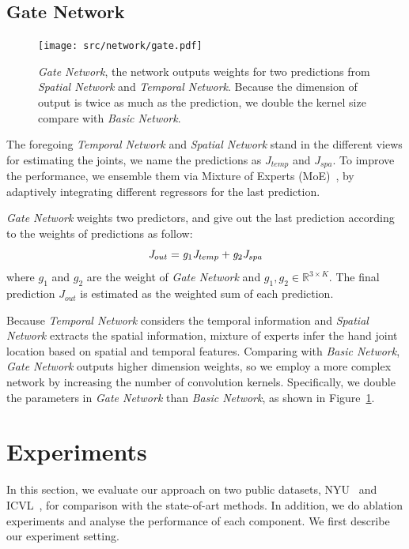 \documentclass[journal,comsoc]{IEEEtran}
\let\MYoriglatexcaption\caption
\renewcommand{\caption}[2][\relax]{\MYoriglatexcaption[#2]{#2}}
\begin{document}
\subsection{Gate Network}\label{sec:gate network}
\begin{figure}[t]\footnotesize
\centering
    \texttt{[image: src/network/gate.pdf]}
    \caption{\emph{Gate Network}, the network outputs weights for two predictions from \emph{Spatial Network} and \emph{Temporal Network}.
    Because the dimension of output is twice as much as the prediction, we double the kernel size compare with \emph{Basic Network}.}
\label{fig:gate}
\end{figure}
The foregoing \emph{Temporal Network} and \emph{Spatial Network} stand in the different views
for estimating the joints, we name the predictions as $\mathit{J}_{temp}$ and $\mathit{J}_{spa}$. To improve
the performance, we ensemble them via Mixture of Experts (MoE)~\cite{jacobs1991adaptive}, by adaptively integrating
different regressors for the last prediction.

\emph{Gate Network} weights two predictors, and give out the last prediction according to
the weights of predictions as follow:
\begin{equation}\label{eq:gate network}
\centering
\mathit{J}_{out} = \mathit{g}_1 \mathit{J}_{temp} + \mathit{g}_2 \mathit{J}_{spa}
\end{equation}
where $\mathit{g}_1$ and $\mathit{g}_2$ are the weight of \emph{Gate Network} and $\mathit{g}_1, \mathit{g}_2 \in
\mathbb{R}^{3 \times K}$. The final prediction $\mathit{J}_{out}$ is estimated as the weighted sum of each prediction.

Because \emph{Temporal Network} considers the temporal information and \emph{Spatial Network}
extracts the spatial information, mixture of experts infer the hand joint location based on
spatial and temporal features. Comparing with \emph{Basic Network}, \emph{Gate Network} outputs higher
dimension weights, so we employ a more complex network by increasing the number of convolution kernels.
Specifically, we double the parameters in \emph{Gate Network} than \emph{Basic Network}, as shown in Figure~\ref{fig:gate}.

\section{Experiments}\label{sec:experiments}
In this section, we evaluate our approach on two public datasets, NYU~\cite{tompson2014real}
and ICVL~\cite{tang2014latent}, for comparison with the state-of-art methods. In addition, we
do ablation experiments and analyse the performance of each component. We first describe our
experiment setting.
\end{document}
